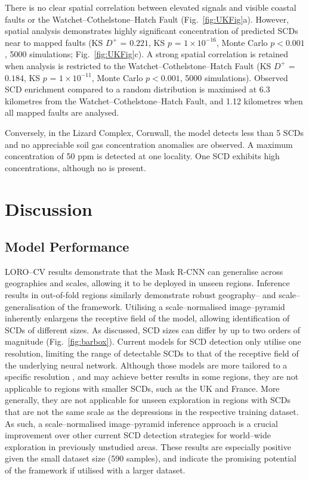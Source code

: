 \documentclass[12pt]{article}
\begin{document}
There is no clear spatial correlation between elevated  signals and visible coastal faults or the Watchet--Cothelstone--Hatch Fault (Fig.~\ref{fig:UKFig}a). However, spatial analysis demonstrates highly significant concentration of predicted SCDs near to mapped faults (KS $D^+$ = $0.221$, KS $p$ = $1 \times 10^{-16}$, Monte Carlo $p <  0.001$, 5000 simulations; Fig.~\ref{fig:UKFig}c). A strong spatial correlation is retained when analysis is restricted to the Watchet--Cothelstone--Hatch Fault (KS $D^+$ = $0.184$, KS $p$ = $1 \times 10^{-11}$, Monte Carlo $p <  0.001$, 5000 simulations). Observed SCD enrichment compared to a random distribution is maximised at 6.3 kilometres from the Watchet--Cothelstone--Hatch Fault, and 1.12 kilometres when all mapped faults are analysed.

Conversely, in the Lizard Complex, Cornwall, the model detects less than 5 SCDs and no appreciable soil gas  concentration anomalies are observed. A maximum concentration of 50 ppm is detected at one locality. One SCD exhibits high  concentrations, although no  is present.

\section{Discussion}

\subsection{Model Performance}

LORO--CV results demonstrate that the Mask R-CNN can generalise across geographies and scales, allowing it to be deployed in unseen regions. Inference results in out-of-fold regions similarly demonstrate robust geography-- and scale--generalisation of the framework. Utilising a scale--normalised image--pyramid inherently enlargens the receptive field of the model, allowing identification of SCDs of different sizes. As discussed, SCD sizes can differ by up to two orders of magnitude (Fig.~\ref{fig:barbox}). Current models for SCD detection only utilise one resolution, limiting the range of detectable SCDs to that of the receptive field of the underlying neural network. Although those models are more tailored to a specific resolution \cite{ROCHE2026107617, NG}, and may achieve better results in some regions, they are not applicable to regions with smaller SCDs, such as the UK and France. More generally, they are not applicable for unseen exploration in regions with SCDs that are not the same scale as the depressions in the respective training dataset. As such, a scale--normalised image--pyramid inference approach is a crucial improvement over other current SCD detection strategies for world--wide  exploration in previously unstudied areas. These results are especially positive given the small dataset size (590 samples), and indicate the promising potential of the framework if utilised with a larger dataset.
\end{document}
